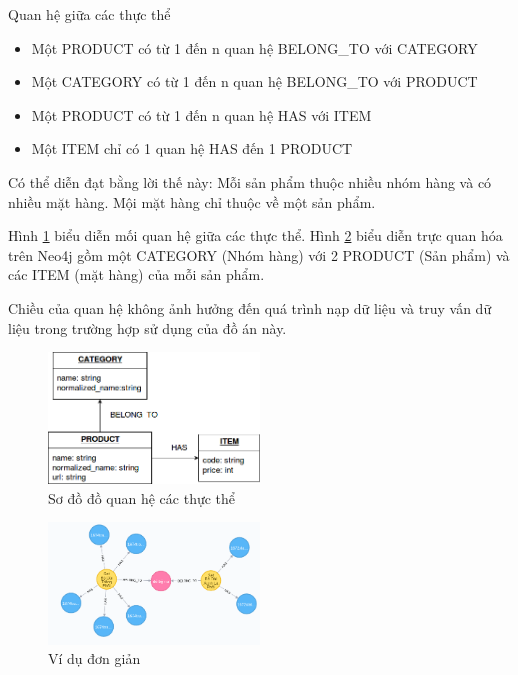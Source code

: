 Quan hệ giữa các thực thể 
\begin{itemize}
\item Một PRODUCT có từ 1 đến n quan hệ BELONG\_TO với CATEGORY
\item Một CATEGORY có từ 1 đến n quan hệ BELONG\_TO với PRODUCT
\item Một PRODUCT có từ 1 đến n quan hệ HAS với ITEM 
\item Một ITEM chỉ có 1 quan hệ HAS đến 1 PRODUCT 
\end{itemize}

Có thể diễn đạt bằng lời thế này: Mỗi sản phẩm thuộc nhiều nhóm hàng và có nhiều mặt hàng. Mội mặt hàng chỉ thuộc về một sản phẩm. 

Hình \ref{fig:datastructure} biểu diễn mối quan hệ giữa các thực thể. Hình \ref{fig:datastructureexample} biểu diễn trực quan hóa trên Neo4j gồm một CATEGORY (Nhóm hàng) với 2 PRODUCT (Sản phẩm) và các ITEM (mặt hàng) của mỗi sản phẩm.  

Chiều của quan hệ không ảnh hưởng đến quá trình nạp dữ liệu và truy vấn dữ liệu trong trường hợp sử dụng của đồ án này. 

\begin{figure}[h]
\centering
\includegraphics[width=0.5\textwidth]{image/neo4jdatastructure.png}
\caption{\label{fig:datastructure} Sơ đồ đồ quan hệ các thực thể}
\end{figure}


\begin{figure}[h]
\centering
\includegraphics[width=0.5\textwidth]{imagev2/vddatamodel.png}
\caption{\label{fig:datastructureexample} Ví dụ đơn giản}
\end{figure}



